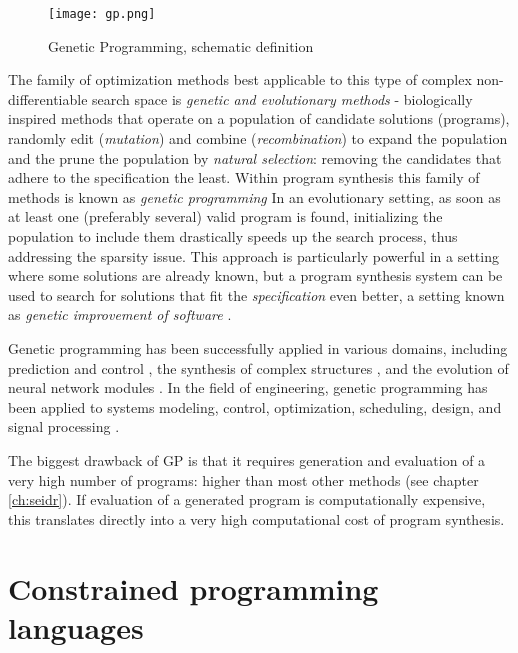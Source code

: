 \begin{figure}
    \centering
    \texttt{[image: gp.png]}
    \caption{Genetic Programming, schematic definition}
    \label{fig:gp}
\end{figure}

The family of optimization methods best applicable to this type of complex non-differentiable search space is \emph{genetic and evolutionary methods} - biologically inspired methods that operate on a population of candidate solutions (programs), randomly edit (\emph{mutation}) and combine (\emph{recombination}) to expand the population and the prune the population by \emph{natural selection}: removing the candidates that adhere to the specification the least.
Within program synthesis this family of methods is known as \emph{genetic programming} \cite{genprog1, genprog2, genprogast}
In an evolutionary setting, as soon as at least one (preferably several) valid program is found, initializing the population to include them drastically speeds up the search process, thus addressing the sparsity issue.
This approach is particularly powerful in a setting where some solutions are already known, but a program synthesis system can be used to search for solutions that fit the \emph{specification} even better, a setting known as \emph{genetic improvement of software} \cite{petke2018:genetic}.

Genetic programming has been successfully applied in various domains, including prediction and control \cite{dracopoulosGeneticProgrammingPrediction1997}, the synthesis of complex structures \cite{kozaHumancompetitiveApplicationsGenetic2003}, and the evolution of neural network modules \cite{degarisGENETICPROGRAMMING1990}. In the field of engineering, genetic programming has been applied to systems modeling, control, optimization, scheduling, design, and signal processing \cite{willisGeneticProgrammingIntroduction1997}. 

The biggest drawback of GP is that it requires generation and evaluation of a very high number of programs: higher than most other methods (see chapter \ref{ch:seidr}).
If evaluation of a generated program is computationally expensive, this translates directly into a very high computational cost of program synthesis.

\newpage
\section{Constrained programming languages}
\label{sec:constrainedpl}

